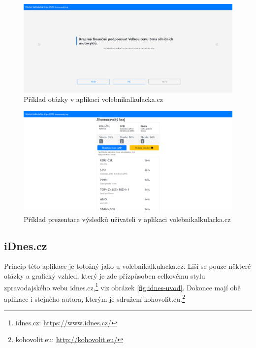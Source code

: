\begin{figure}
    \centering
    \includegraphics[width=1\textwidth]{obrazky-figures/volebnikalkulacka-otazka.png}
    \caption{Příklad otázky v aplikaci volebnikalkulacka.cz}
    \label{fig:volebnikalkulacka-otazka}
\end{figure}

\begin{figure}
    \centering
    \includegraphics[width=1\textwidth]{obrazky-figures/volebnikalkulacka-vysledky.png}
    \caption{Příklad prezentace výsledků uživateli v aplikaci volebnikalkulacka.cz}
    \label{fig:volebnikalkulacka-vysledky}
\end{figure}




\subsection{iDnes.cz}
Princip této aplikace je totožný jako u volebnikalkulacka.cz. Liší se pouze některé otázky a grafický vzhled, který je zde přizpůsoben celkovému stylu zpravodajského webu idnes.cz,\footnote{idnes.cz: \url{https://www.idnes.cz/}} viz obrázek \ref{fig:idnes-uvod}. Dokonce mají obě aplikace i stejného autora, kterým je sdružení \mbox{kohovolit.eu}.\footnote{kohovolit.eu: \url{http://kohovolit.eu/}}

